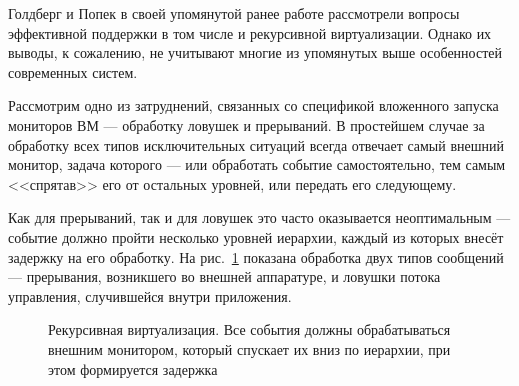 Голдберг и Попек в своей упомянутой ранее работе рассмотрели вопросы эффективной поддержки в том числе и рекурсивной виртуализации. Однако их выводы, к сожалению, не учитывают многие из упомянутых выше особенностей современных систем. 

Рассмотрим одно из затруднений, связанных со спецификой вложенного запуска мониторов ВМ --- обработку ловушек и прерываний. 
В простейшем случае за обработку всех типов исключительных ситуаций всегда отвечает самый внешний монитор, задача которого --- или обработать событие самостоятельно, тем самым <<спрятав>> его от остальных уровней, или передать его следующему. 

Как для прерываний, так и для ловушек это часто оказывается неоптимальным --- событие должно пройти несколько уровней иерархии, каждый из которых внесёт задержку на его обработку. На рис.~\ref{fig:recursive-vm} показана обработка двух типов сообщений --- прерывания, возникшего во внешней аппаратуре, и ловушки потока управления, случившейся внутри приложения.

\begin{figure}[htb]
    \centering
{}
    \caption[Рекурсивная виртуализация]{Рекурсивная виртуализация. Все события должны обрабатываться внешним монитором, который спускает их вниз по иерархии, при этом формируется задержка}
    \label{fig:recursive-vm}
\end{figure}

